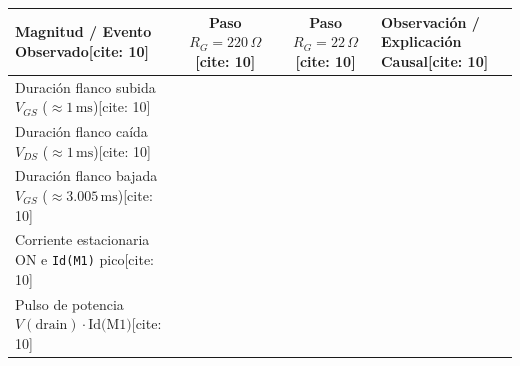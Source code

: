 \documentclass[11pt, a4paper]{article}
\begin{document}
\vspace{0.2cm}
\renewcommand{\arraystretch}{1.45}
\noindent
\begin{tabularx}{\textwidth}{|>{\raggedright\arraybackslash}X|c|c|>{\raggedright\arraybackslash}X|}
\hline
\textbf{Magnitud / Evento Observado}[cite: 10] & \textbf{Paso $R_G = 220\,\Omega$}[cite: 10] & \textbf{Paso $R_G = 22\,\Omega$}[cite: 10] & \textbf{Observación / Explicación Causal}[cite: 10] \\ \hline
Duración flanco subida $V_{GS}$ ($\approx 1\,\text{ms}$)[cite: 10] & \hspace{2.6cm} & \hspace{2.6cm} & \\ \hline
Duración flanco caída $V_{DS}$ ($\approx 1\,\text{ms}$)[cite: 10] & & & \\ \hline
Duración flanco bajada $V_{GS}$ ($\approx 3.005\,\text{ms}$)[cite: 10] & & & \\ \hline
Corriente estacionaria ON e \texttt{Id(M1)} pico[cite: 10] & & & \\ \hline
Pulso de potencia $V(\text{drain})\cdot\text{Id(M1)}$[cite: 10] & & & \\ \hline
\end{tabularx}
\end{document}
